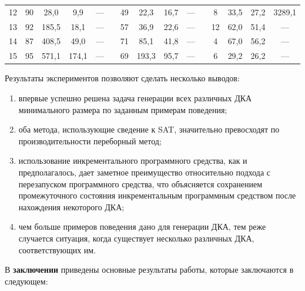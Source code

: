 \begin{table}
{\begin{tabular}{ccccccccccccccc}
      12 & 90  & 28,0  & 9,9   & ---            & & 49  & 22,3  & 16,7 & ---             & & 8   & 33,5 & 27,2 & 3289,1 \\
      13 & 92  & 185,5 & 18,1  & ---            & & 57  & 36,9  & 22,6 & ---             & & 12  & 62,0 & 51,4 & ---\\
      14 & 87  & 408,5 & 49,0  & ---            & & 71  & 85,1  & 41,8 & ---             & & 4   & 67,0 & 56,2 & ---\\
      15 & 95  & 571,1 & 174,1 & ---            & & 69  & 193,3 & 95,7 & ---             & & 6   & 29,2 & 26,2 & ---\\
      \hline
    \end{tabular}
  }
  \label{syn:tab:find-all}
\end{table}


Результаты экспериментов позволяют сделать несколько выводов:
\begin{enumerate}
  \item впервые успешно решена задача генерации всех различных ДКА минимального размера по заданным примерам поведения;
  \item оба метода, использующие сведение к SAT, значительно превосходят по производительности переборный метод;
  \item использование инкрементального программного средства, как и предполагалось, дает заметное преимущество относительно подхода с перезапуском программного средства, что объясняется сохранением промежуточного состояния инкрементальным программным средством после нахождения некоторого ДКА;
  \item чем больше примеров поведения дано для генерации ДКА, тем реже случается ситуация, когда существует несколько различных ДКА, соответствующих им.
\end{enumerate}



В \textbf{заключении} приведены основные результаты работы, которые заключаются в следующем:

